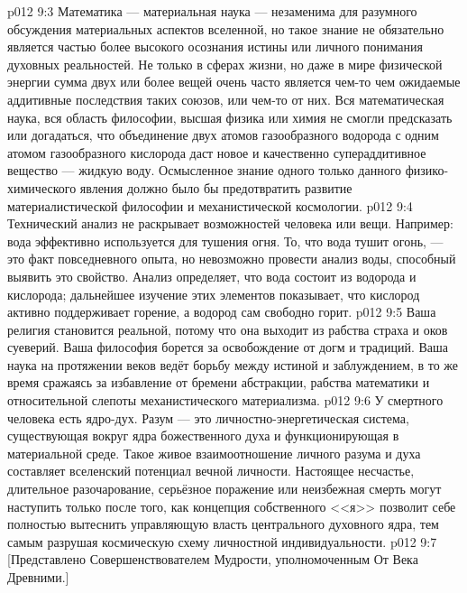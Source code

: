 \vs p012 9:3 Математика --- материальная наука --- незаменима для разумного обсуждения материальных аспектов вселенной, но такое знание не обязательно является частью более высокого осознания истины или личного понимания духовных реальностей. Не только в сферах жизни, но даже в мире физической энергии сумма двух или более вещей очень часто является чем\hyp{}то  чем ожидаемые аддитивные последствия таких союзов, или чем\hyp{}то  от них. Вся математическая наука, вся область философии, высшая физика или химия не смогли предсказать или догадаться, что объединение двух атомов газообразного водорода с одним атомом газообразного кислорода даст новое и качественно супераддитивное вещество --- жидкую воду. Осмысленное знание одного только данного физико\hyp{}химического явления должно было бы предотвратить развитие материалистической философии и механистической космологии.
\vs p012 9:4 Технический анализ не раскрывает возможностей человека или вещи. Например: вода эффективно используется для тушения огня. То, что вода тушит огонь, --- это факт повседневного опыта, но невозможно провести анализ воды, способный выявить это свойство. Анализ определяет, что вода состоит из водорода и кислорода; дальнейшее изучение этих элементов показывает, что кислород активно поддерживает горение, а водород сам свободно горит.
\vs p012 9:5 Ваша религия становится реальной, потому что она выходит из рабства страха и оков суеверий. Ваша философия борется за освобождение от догм и традиций. Ваша наука на протяжении веков ведёт борьбу между истиной и заблуждением, в то же время сражаясь за избавление от бремени абстракции, рабства математики и относительной слепоты механистического материализма.
\vs p012 9:6 \pc У смертного человека есть ядро\hyp{}дух. Разум --- это личностно\hyp{}энергетическая система, существующая вокруг ядра божественного духа и функционирующая в материальной среде. Такое живое взаимоотношение личного разума и духа составляет вселенский потенциал вечной личности. Настоящее несчастье, длительное разочарование, серьёзное поражение или неизбежная смерть могут наступить только после того, как концепция собственного <<я>> позволит себе полностью вытеснить управляющую власть центрального духовного ядра, тем самым разрушая космическую схему личностной индивидуальности.
\vsetoff
\vs p012 9:7 [Представлено Совершенствователем Мудрости, уполномоченным От Века Древними.]
\quizlink
